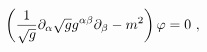 \begin{equation}
\left({1\over \sqrt{g}}\partial_\alpha \sqrt{g}g^{\alpha\beta}
\partial_\beta -m^2\right)\varphi=0\ ,
\label{massscalar}
\end{equation}

